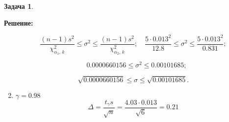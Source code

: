 \documentclass[a4paper,11pt]{article}
\newenvironment{shdd}{\begin{mdframed}[backgroundcolor=shadecolor]}{\end{mdframed}}
\theoremstyle{definition}
\newtheorem{problem}{Задача}\setlength{\parindent}{0pt}
\newenvironment{solution}
{\begin{shdd}\textbf{Решение:}\par\setlength{\parindent}{0pt}}
{\end{shdd}}
\newenvironment{answer}
{\par\noindent\textbf{Ответ:}}
{\par}
\begin{document}
\begin{problem}
\begin{solution}
\begin{enumerate}
                         \[
                         \frac{(n-1)s^2}{\chi^2_{\alpha_1, \, k}} \leq \sigma^2 \leq \frac{(n-1)s^2}{\chi^2_{\alpha_2, \, k}};
                         \quad\frac{5\cdot 0.013^2}{12.8} \leq \sigma^2 \leq \frac{5\cdot 0.013^2}{0.831};
                         \]

                         \[
                         \quad 0.0000660156 \leq\sigma^2 \leq 0.00101685;
                         \]

                         \[
                         \sqrt{0.0000660156} \leq\sigma \leq \sqrt{0.00101685}.
                         \]
        
            \item \(\gamma=0.98\)
                  \[\Delta = \frac{t_{\gamma}s}{\sqrt{n}} = \frac{4.03\cdot 0.013}{\sqrt{6}} = 0.21\]
        \end{enumerate}
    \end{solution}


\end{problem}
\end{document}
